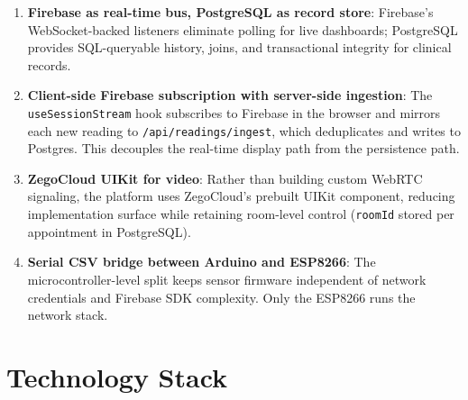 \documentclass[12pt,a4paper]{report}
\begin{document}
\begin{enumerate}[leftmargin=1.5em]
  \item \textbf{Firebase as real-time bus, PostgreSQL as record store}:
        Firebase's WebSocket-backed listeners eliminate polling for live
        dashboards; PostgreSQL provides SQL-queryable history, joins, and
        transactional integrity for clinical records.

  \item \textbf{Client-side Firebase subscription with server-side ingestion}:
        The \texttt{useSessionStream} hook subscribes to Firebase in the browser
        and mirrors each new reading to \texttt{/api/readings/ingest}, which
        deduplicates and writes to Postgres. This decouples the real-time
        display path from the persistence path.

  \item \textbf{ZegoCloud UIKit for video}: Rather than building custom WebRTC
        signaling, the platform uses ZegoCloud's prebuilt UIKit component,
        reducing implementation surface while retaining room-level control
        (\texttt{roomId} stored per appointment in PostgreSQL).

  \item \textbf{Serial CSV bridge between Arduino and ESP8266}: The
        microcontroller-level split keeps sensor firmware independent of
        network credentials and Firebase SDK complexity. Only the ESP8266
        runs the network stack.
\end{enumerate}

\chapter{Technology Stack}
\label{ch:stack}
\end{document}
